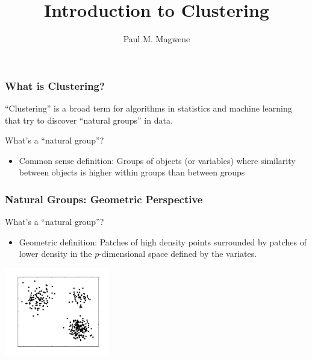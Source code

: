 \documentclass{beamer}
\title{Introduction to Clustering}
\author{Paul M. Magwene}
\date{}
\begin{document}
\begin{frame}
\titlepage
\end{frame}


\begin{frame}
  \frametitle{What is Clustering?}

``Clustering'' is a broad term for algorithms in statistics and machine learning
that try to discover ``natural groups'' in data.

What's a ``natural group''?


\begin{itemize}
  \item Common sense definition: Groups of objects (or variables) where similarity between objects is higher within groups than between groups
\end{itemize}

\end{frame}


\begin{frame}
  \frametitle{Natural Groups: Geometric Perspective}

What's a ``natural group''?

\begin{itemize}
  \item Geometric definition: Patches of high density points surrounded by patches of lower density in the $p$-dimensional space defined by the variates.
\end{itemize}

\begin{center}
\includegraphics[height=1.5in]{cluster-fig.pdf}
\end{center}

\end{frame}
\end{document}
